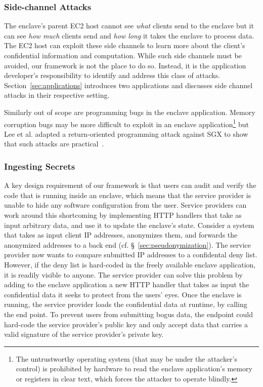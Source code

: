 \subsubsection{Side-channel Attacks}
\label{sec:side-channels}

The enclave's parent EC2 host cannot see \emph{what} clients send to the enclave
but it can see \emph{how much} clients send and \emph{how long} it takes the
enclave to process data.  The EC2 host can exploit these side channels to learn
more about the client's confidential information and computation.  While such
side channels must be avoided, our framework is not the place to do so.
Instead, it is the application developer's responsibility to identify and
address this class of attacks.  Section~\ref{sec:applications} introduces two
applications and discusses side channel attacks in their respective setting.

Similarly out of scope are programming bugs in the enclave application.  Memory
corruption bugs may be more difficult to exploit in an enclave
application\footnote{The untrustworthy operating system (that may be under the
attacker's control) is prohibited by hardware to read the enclave application's
memory or registers in clear text, which forces the attacker to operate
blindly.} but Lee et al. adapted a return-oriented programming attack against
SGX to show that such attacks are practical~\cite{Lee2017a}.

\subsubsection{Ingesting Secrets}
\label{sec:secrets}

A key design requirement of our framework is that users can audit and verify the
code that is running inside an enclave, which means that the service provider is
unable to hide any software configuration from the user.  Service providers can
work around this shortcoming by implementing HTTP handlers that take as input
arbitrary data, and use it to update the enclave's state.  Consider a system
that takes as input client IP addresses, anonymizes them, and forwards the
anonymized addresses to a back end (cf. \S~\ref{sec:pseudonymization}).  The
service provider now wants to compare submitted IP addresses to a confidental
deny list.  However, if the deny list is hard-coded in the freely available
enclave application, it is readily visible to anyone.  The service provider can
solve this problem by adding to the enclave application a new HTTP handler that
takes as input the confidential data it seeks to protect from the users' eyes.
Once the enclave is running, the service provider loads the confidential data
at runtime, by calling the end point.  To prevent users from submitting bogus
data, the endpoint could hard-code the service provider's public key and only
accept data that carries a valid signature of the service provider's private
key.

